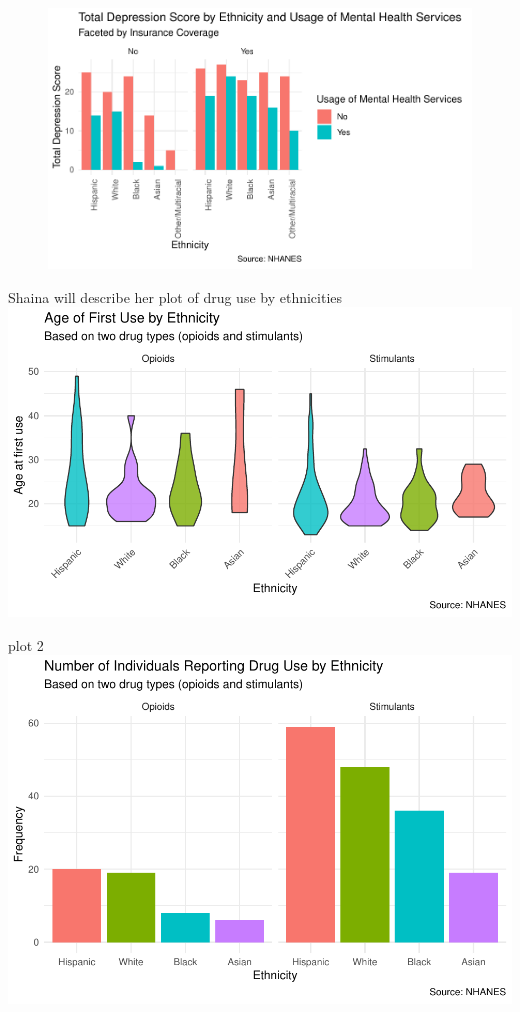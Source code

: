 \documentclass[man]{apa6}
\begin{document}
\begin{figure}
\centering
\includegraphics{Final_Paper_Group_3_files/figure-latex/plot1-1.pdf}
\caption{}
\end{figure}

Shaina will describe her plot of drug use by ethnicities
\includegraphics{Final_Paper_Group_3_files/figure-latex/ST_plot1-1.pdf}

plot 2
\includegraphics{Final_Paper_Group_3_files/figure-latex/ST_plot-1.pdf}
\end{document}
